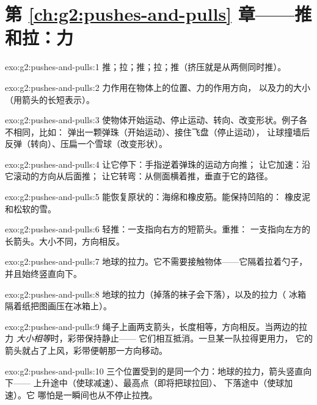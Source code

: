 \section*{第 \ref{ch:g2:pushes-and-pulls} 章——推和拉：力}

\begin{solution}{exo:g2:pushes-and-pulls:1}
推；拉；推；拉；推（挤压就是从两侧同时推）。
\end{solution}

\begin{solution}{exo:g2:pushes-and-pulls:2}
力作用在物体上的位置、力的作用方向，
以及力的大小（用箭头的长短表示）。
\end{solution}

\begin{solution}{exo:g2:pushes-and-pulls:3}
使物体开始运动、停止运动、转向、改变形状。例子各不相同，比如：
弹出一颗弹珠（开始运动）、接住飞盘（停止运动），
让球撞墙后反弹（转向）、压扁一个雪球（改变形状）。
\end{solution}

\begin{solution}{exo:g2:pushes-and-pulls:4}
让它停下：手指逆着弹珠的运动方向推；
让它加速：沿它滚动的方向从后面推；
让它转弯：从侧面横着推，垂直于它的路径。
\end{solution}

\begin{solution}{exo:g2:pushes-and-pulls:5}
能恢复原状的：海绵和橡皮筋。能保持凹陷的：
橡皮泥和松软的雪。
\end{solution}

\begin{solution}{exo:g2:pushes-and-pulls:6}
轻推：一支指向右方的短箭头。重推：
一支指向左方的长箭头。大小不同，方向相反。
\end{solution}

\begin{solution}{exo:g2:pushes-and-pulls:7}
地球的拉力。它不需要接触物体——它隔着拉着勺子，
并且始终竖直向下。
\end{solution}

\begin{solution}{exo:g2:pushes-and-pulls:8}
地球的拉力（掉落的袜子会下落），以及的拉力（
冰箱隔着纸把图画压在冰箱上）。
\end{solution}

\begin{solution}{exo:g2:pushes-and-pulls:9}
绳子上画两支箭头，长度相等，方向相反。当两边的拉力
\emph{大小相等}时，彩带保持静止——
它们相互抵消。一旦某一队拉得更用力，
它的箭头就占了上风，彩带便朝那一方向移动。
\end{solution}

\begin{solution}{exo:g2:pushes-and-pulls:10}
三个位置受到的是同一个力：地球的拉力，箭头竖直向下——
上升途中（使球减速）、最高点（即将把球拉回）、
下落途中（使球加速）。它
哪怕是一瞬间也从不停止拉拽。
\end{solution}
